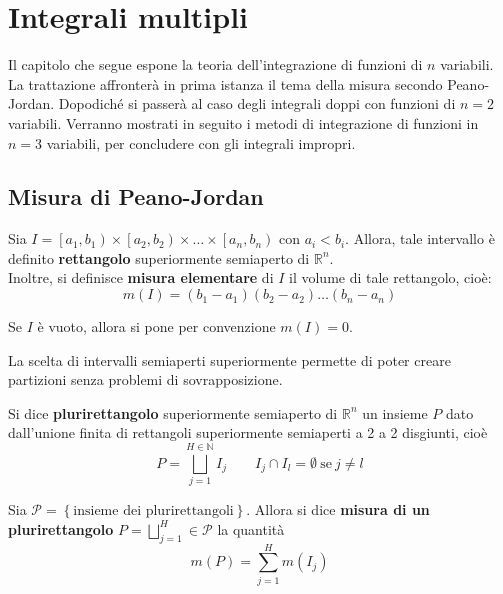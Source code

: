 \chapter{Integrali multipli}
Il capitolo che segue espone la teoria dell'integrazione di funzioni di $n$ variabili. La trattazione affronterà in prima istanza il tema della misura secondo Peano-Jordan. Dopodiché si passerà al caso degli integrali doppi con funzioni di $n=2$ variabili. Verranno mostrati in seguito i metodi di integrazione di funzioni in $n=3$ variabili, per concludere con gli integrali impropri.
\section{Misura di Peano-Jordan}
\begin{definition} \label{Def: Rettangolo}
Sia $I=\left[a_1, b_1\right) \times \left[a_2, b_2 \right) \times \dots \times \left[a_n, b_n \right)$ con $a_i < b_i$. Allora, tale intervallo è definito \textbf{rettangolo} superiormente semiaperto di $\mathbb{R}^n$.\\
Inoltre, si definisce \textbf{misura elementare} di $I$ il volume di tale rettangolo, cioè:
\begin{equation}
    m(I)=\left(b_1-a_1\right)\left(b_2-a_2\right)\dots\left(b_n-a_n\right)
\end{equation}
\end{definition}
\begin{oss}
    Se $I$ è vuoto, allora si pone per convenzione $m(I)=0$.
\end{oss}
\begin{oss}
    La scelta di intervalli semiaperti superiormente permette di poter creare partizioni senza problemi di sovrapposizione.
\end{oss}
\begin{definition} \label{Def: Plurirettangolo}
    Si dice \textbf{plurirettangolo} superiormente semiaperto di $\mathbb{R}^n$ un insieme $P$ dato dall'unione finita di rettangoli superiormente semiaperti a 2 a 2 disgiunti, cioè
    \begin{equation}
        P= \bigsqcup_{j=1}^{H \in \mathbb{N}} I_j \qquad I_j \cap I_l = \emptyset\ \text{se}\ j\neq l
    \end{equation}
\end{definition}
\begin{definition} \label{Def: Misura di un plurirettangolo}
Sia $\mathcal{P}= \left\{\text{insieme dei plurirettangoli}\right\}$. Allora si dice \textbf{misura di un plurirettangolo} $P=\bigsqcup\limits_{j=1}^{H} \in \mathcal{P}$ la quantità
\begin{equation}
    m(P)= \sum_{j=1}^{H}{m(I_j)}
\end{equation}
\end{definition}
